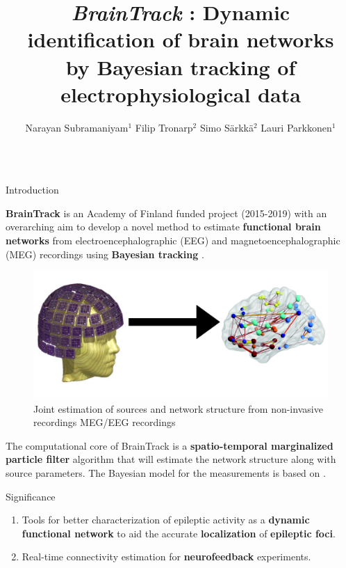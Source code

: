\documentclass[serif,final]{beamer}
\title{\textit{BrainTrack} : Dynamic identification of brain networks \\ by Bayesian tracking of electrophysiological data}
\author{Narayan Subramaniyam$^{1}$ \quad Filip Tronarp$^{2}$ \quad Simo S\"arkk\"a$^{2}$ \quad Lauri Parkkonen$^{1}$}
\institute{$^{1}$ Department of Neuroscience and Biomedical Engineering \\ $^{2}$ Department of Electrical Engineering and Automation}
\begin{document}
\begin{frame}{}
  \begin{columns}[t]

    \begin{column}{0.45\linewidth}

      \begin{block}{Introduction}
      \begin{flushleft}
			\textbf{\color{blue} BrainTrack} is an Academy of Finland 	  funded project (2015-2019) with an overarching aim to develop a novel method to estimate \textbf{\color{blue}functional brain \\ networks} from electroencephalographic (EEG) and magnetoencephalographic (MEG) recordings using \textbf{\color{blue} Bayesian tracking} \cite{sarkka2013bayesian}.
	\end{flushleft}
    \begin{figure}
          \centering
          \includegraphics[scale=0.75]{intro_1}
          \caption{Joint estimation of sources and network structure from non-invasive recordings MEG/EEG recordings}
           \label{fig1}
    \end{figure}
The computational core of BrainTrack is a \textbf{\color{blue} spatio-temporal marginalized particle filter} algorithm \cite{sarkka2013bayesian} that will estimate the network structure along with source parameters. The Bayesian model for the measurements is based on \cite{sorrentino2009dynamical,chen2013probabilistic}.
    \end{block}

    \begin{block}{Significance}
        \begin{enumerate}
		\setlength\itemsep{0.25em}
		\item Tools for better characterization of epileptic activity as a \textbf{\color {blue} dynamic functional network} to aid the accurate 	\textbf{\color {blue} localization} of \textbf{\color {blue} epileptic foci}.
		\item Real-time connectivity estimation for \textbf{\color {blue} neurofeedback} experiments.
		\end{enumerate}
    \end{block}


\end{column}
\end{columns}
\end{frame}
\end{document}
